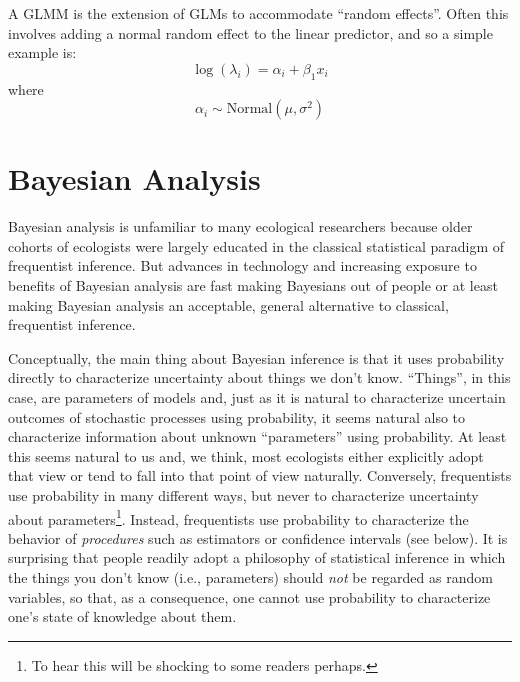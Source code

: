 A GLMM is the extension of GLMs to accommodate ``random
effects''. Often this involves adding a normal random effect to the
linear predictor, and so a simple example is:
\[
 \log(\lambda_{i}) = \alpha_{i} + \beta_{1} x_{i}
\]
where
\[
 \alpha_{i} \sim \mbox{Normal}(\mu,\sigma^{2})
\]



\section{Bayesian Analysis}

Bayesian analysis is unfamiliar to many ecological researchers because
older cohorts of ecologists were largely educated in the classical
statistical paradigm of frequentist inference. But advances in
technology and increasing exposure to benefits of Bayesian analysis
are fast making Bayesians out of people or at least making Bayesian
analysis an acceptable, general alternative to classical, frequentist
inference.

Conceptually, the main thing about Bayesian inference is that it uses
probability directly to characterize uncertainty about things we don't
know.  ``Things'', in this case, are parameters of models and, just as
it is natural to characterize uncertain outcomes of stochastic
processes using probability, it seems natural also to characterize
information about unknown ``parameters'' using probability. At least
this seems natural to us and, we think, most ecologists either
explicitly adopt that view or tend to fall into that point of view
naturally.  Conversely, frequentists use probability in many different
ways, but never to characterize uncertainty about
parameters\footnote{To hear this will be shocking to some readers
  perhaps.}. Instead, frequentists use probability to characterize the
behavior of {\it procedures} such as estimators or confidence
intervals (see below). It is surprising that people readily
adopt a philosophy of statistical inference in which the things you
don't know (i.e., parameters) should {\it not} be regarded as random
variables, so that, as a consequence, one cannot use probability to
characterize one's state of knowledge about them.


